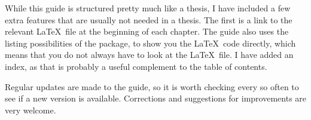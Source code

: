 While this guide is structured pretty much like a thesis, I have
included a few extra features that are usually not needed in a thesis.
The first is a link to the relevant \LaTeX\ file at the beginning of each chapter.
The guide also uses the listing possibilities of the  package,
to show you the \LaTeX\ code directly,
which means that you do not always have to look at the \LaTeX\ file.
I have added an index, as that is probably a useful complement to the table of contents.

Regular updates are made to the guide, so it is worth checking every
so often to see if a new version is available. Corrections and
suggestions for improvements are very welcome.
